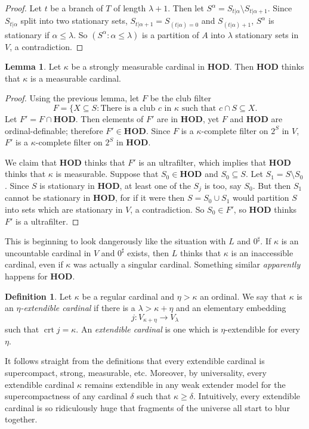 \documentclass[12pt]{report}
\newcommand{\HOD}{\mathbf{HOD}}
\DeclareMathOperator{\crt}{crt}
\newcommand{\dfn}[1]{\emph{#1}\index{#1}}
\theoremstyle{definition}
\newtheorem{lemma}[theorem]{Lemma}
\newtheorem{definition}[theorem]{Definition}
\begin{document}
\begin{proof}
Let $t$ be a branch of $T$ of length $\lambda + 1$. Then let $S^\alpha = S_{t|\alpha} \setminus S_{t|\alpha+1}$.
Since $S_{t|\alpha}$ split into two stationary sets, $S_{t|\alpha+1} = S_{(t|\alpha)=0}$ and $S_{(t|\alpha)+1}$, $S^\alpha$ is stationary if $\alpha \leq \lambda$.
So $(S^\alpha:\alpha \leq \lambda)$ is a partition of $A$ into $\lambda$ stationary sets in $V$, a contradiction.
\end{proof}

\begin{lemma}
Let $\kappa$ be a strongly measurable cardinal in $\HOD$. Then $\HOD$ thinks that $\kappa$ is a measurable cardinal.
\end{lemma}
\begin{proof}
Using the previous lemma, let $F$ be the club filter
$$F = \{X \subseteq S: \text{There is a club $c$ in $\kappa$ such that $c \cap S \subseteq X$}.$$
Let $F' = F \cap \HOD$. Then elements of $F'$ are in $\HOD$, yet $F$ and $\HOD$ are ordinal-definable; therefore $F' \in \HOD$.
Since $F$ is a $\kappa$-complete filter on $2^S$ in $V$, $F'$ is a $\kappa$-complete filter on $2^S$ in $\HOD$.

We claim that $\HOD$ thinks that $F'$ is an ultrafilter, which implies that $\HOD$ thinks that $\kappa$ is measurable.
Suppose that $S_0 \in \HOD$ and $S_0 \subseteq S$. Let $S_1 = S \setminus S_0$.
Since $S$ is stationary in $\HOD$, at least one of the $S_j$ is too, say $S_0$.
But then $S_1$ cannot be stationary in $\HOD$, for if it were then $S = S_0 \cup S_1$ would partition $S$ into sets which are stationary in $V$, a contradiction.
So $S_0 \in F'$, so $\HOD$ thinks $F'$ is a ultrafilter.
\end{proof}
This is beginning to look dangerously like the situation with $L$ and $0^\sharp$.
If $\kappa$ is an uncountable cardinal in $V$ and $0^\sharp$ exists, then $L$ thinks that $\kappa$ is an inaccessible cardinal, even if $\kappa$ was actually a singular cardinal. Something similar \emph{apparently} happens for $\HOD$.

\begin{definition}
Let $\kappa$ be a regular cardinal and $\eta > \kappa$ an ordinal. We say that $\kappa$ is an \dfn{$\eta$-extendible cardinal} if there is a $\lambda > \kappa+\eta$ and an elementary embedding
$$j: V_{\kappa+\eta} \to V_\lambda$$
such that $\crt j = \kappa$. An \dfn{extendible cardinal} is one which is $\eta$-extendible for every $\eta$.
\end{definition}
It follows straight from the definitions that every extendible cardinal is supercompact, strong, measurable, etc.
Moreover, by universality, every extendible cardinal $\kappa$ remains extendible in any weak extender model for the supercompactness of any cardinal $\delta$ such that $\kappa \geq \delta$.
Intuitively, every extendible cardinal is so ridiculously huge that fragments of the universe all start to blur together.
\end{document}
